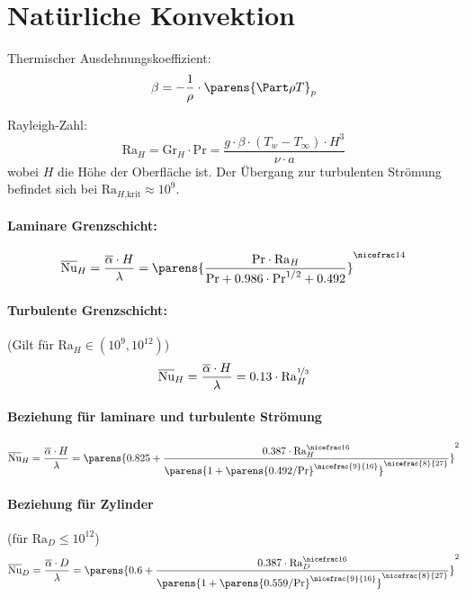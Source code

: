 
\section{Natürliche Konvektion} %
	Thermischer Ausdehnungskoeffizient:
	\[
		\beta = - \frac 1 \rho \cdot \parens{ \Part \rho T }_p
	\]

	Rayleigh-Zahl:
	\[
		\mathrm{Ra}_H = \mathrm{Gr}_H \cdot \mathrm{Pr} = \frac{g \cdot \beta \cdot (T_w - T_\infty) \cdot H^3}{\nu \cdot a}
	\]
	wobei $H$ die Höhe der Oberfläche ist. Der Übergang zur turbulenten Strömung befindet sich bei $\mathrm{Ra}_{H\text{,krit}} \approx 10^9$.

	\paragraph{Laminare Grenzschicht:} %
		\[
			\overline{\mathrm{Nu}}_H = \frac{\overline{\alpha} \cdot H}{\lambda} =
			\parens{\frac{\mathrm{Pr} \cdot \mathrm{Ra}_H}{\mathrm{Pr} + 0.986 \cdot \mathrm{Pr}^{1/2} + 0.492}}^{\nicefrac 1 4}
		\]

	\paragraph{Turbulente Grenzschicht:} %
		(Gilt für $\mathrm{Ra}_H \in (10^9,10^{12})$)
		\[
			\overline{\mathrm{Nu}}_H = \frac{\overline{\alpha} \cdot H}{\lambda} =
			0.13 \cdot \mathrm{Ra}_H^{\nicefrac 1 3}
		\]

	\paragraph{Beziehung für laminare und turbulente Strömung} %
		\[
			\overline{\mathrm{Nu}}_H = \frac{\overline{\alpha} \cdot H}{\lambda} = \parens{0.825 + \frac{0.387 \cdot \mathrm{Ra}_H^{\nicefrac 1 6}}{\parens{1 + \parens{0.492 / \mathrm{Pr}}^{\nicefrac{9}{16}}}^{\nicefrac{8}{27}}}}^2
		\]

	\paragraph{Beziehung für Zylinder} %
		(für $\mathrm{Ra}_D \leq 10^{12}$)
		\[
			\overline{\mathrm{Nu}}_D = \frac{\overline{\alpha} \cdot D}{\lambda} = \parens{0.6 + \frac{0.387 \cdot \mathrm{Ra}_D^{\nicefrac 1 6}}{\parens{1 + \parens{0.559 / \mathrm{Pr}}^{\nicefrac{9}{16}}}^{\nicefrac{8}{27}}}}^2
		\]

